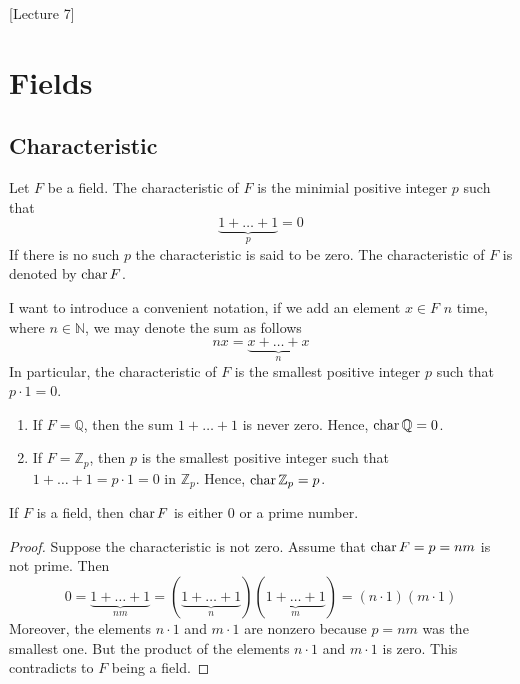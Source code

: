 [Lecture 7]


\section{Fields}

\subsection{Characteristic}

\begin{definition}
Let $F$ be a field.
The characteristic of $F$ is the minimial positive integer $p$ such that
\[
\underbrace{1+\ldots + 1}_p = 0
\]
If there is no such $p$ the characteristic is said to be zero.
The characteristic of $F$ is denoted by $\operatorname{char} F$.
\end{definition}

I want to introduce a convenient notation, if we add an element $x\in F$ $n$ time, where $n\in \mathbb N$, we may denote the sum as follows
\[
n x = \underbrace{x+\ldots + x}_n
\]
In particular, the characteristic of $F$ is the smallest positive integer $p$ such that $p \cdot 1 = 0$.
\begin{examples}
\begin{enumerate}
\item If $F = \mathbb Q$, then the sum $1+\ldots + 1$ is never zero.
Hence, $\operatorname{char} \mathbb Q = 0$.

\item If $F = \mathbb Z_p$, then $p$ is the smallest positive integer such that $1 + \ldots + 1 = p \cdot 1 = 0$ in $\mathbb Z_p$.
Hence, $\operatorname{char} \mathbb Z_p = p$.
\end{enumerate}
\end{examples}

\begin{claim}
If $F$ is a field, then $\operatorname{char} F$ is either $0$ or a prime number.
\end{claim}
\begin{proof}
Suppose the characteristic is not zero.
Assume that $\operatorname{char} F = p = n m$ is not prime.
Then
\[
0 = \underbrace{1+\ldots + 1}_{nm} = (\underbrace{1+\ldots + 1}_{n})(\underbrace{1+\ldots + 1}_{m}) = (n \cdot 1) (m \cdot 1)
\]
Moreover, the elements $n\cdot 1$ and $m\cdot 1$ are nonzero because $p = nm$ was the smallest one.
But the product of the elements $n\cdot 1$ and $m \cdot 1$ is zero.
This contradicts to $F$ being a field.
\end{proof}

